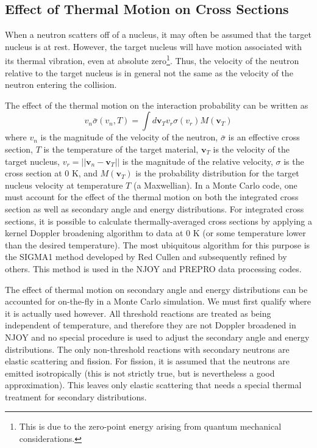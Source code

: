 \subsection{Effect of Thermal Motion on Cross Sections}
\label{sec:freegas}

When a neutron scatters off of a nucleus, it may often be assumed that the
target nucleus is at rest. However, the target nucleus will have motion
associated with its thermal vibration, even at absolute zero\footnote{This is
  due to the zero-point energy arising from quantum mechanical
  considerations.}. Thus, the velocity of the neutron relative to the target
nucleus is in general not the same as the velocity of the neutron entering the
collision.

The effect of the thermal motion on the interaction probability can be written
as
\begin{equation}
  \label{eq:doppler-broaden}
  v_n \bar{\sigma} (v_n, T) = \int d\mathbf{v}_T v_r \sigma(v_r)
  M (\mathbf{v}_T)
\end{equation}
where $v_n$ is the magnitude of the velocity of the neutron, $\bar{\sigma}$ is
an effective cross section, $T$ is the temperature of the target material,
$\mathbf{v}_T$ is the velocity of the target nucleus, $v_r = || \mathbf{v}_n -
\mathbf{v}_T ||$ is the magnitude of the relative velocity, $\sigma$ is the
cross section at 0 K, and $M (\mathbf{v}_T)$ is the probability distribution for
the target nucleus velocity at temperature $T$ (a Maxwellian). In a Monte Carlo
code, one must account for the effect of the thermal motion on both the
integrated cross section as well as secondary angle and energy
distributions. For integrated cross sections, it is possible to calculate
thermally-averaged cross sections by applying a kernel Doppler broadening
algorithm to data at 0 K (or some temperature lower than the desired
temperature). The most ubiquitous algorithm for this purpose is the SIGMA1
method \cite{nse-cullen-1976} developed by Red Cullen and subsequently refined
by others. This method is used in the NJOY \cite{nds-macfarlane-2010} and PREPRO
\cite{iaea-cullen-2012} data processing codes.

The effect of thermal motion on secondary angle and energy distributions can be
accounted for on-the-fly in a Monte Carlo simulation. We must first qualify
where it is actually used however. All threshold reactions are treated as being
independent of temperature, and therefore they are not Doppler broadened in NJOY
and no special procedure is used to adjust the secondary angle and energy
distributions. The only non-threshold reactions with secondary neutrons are
elastic scattering and fission. For fission, it is assumed that the neutrons are
emitted isotropically (this is not strictly true, but is nevertheless a good
approximation). This leaves only elastic scattering that needs a special thermal
treatment for secondary distributions.

